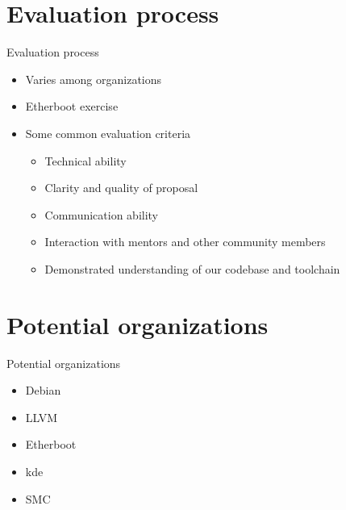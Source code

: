 \documentclass{beamer}
\begin{document}
\section{Evaluation process}
\begin{frame}{Evaluation process}
\begin{itemize}
\item Varies among organizations
\item Etherboot exercise
\item Some common evaluation criteria
\begin{itemize}
\item Technical ability
\item Clarity and quality of proposal
\item Communication ability
\item Interaction with mentors and other community members
\item Demonstrated understanding of our codebase and toolchain
\end{itemize}
\end{itemize}
\end{frame}

\section{Potential organizations}
\begin{frame}{Potential organizations}
\begin{itemize}
\item Debian
\item LLVM
\item Etherboot
\item kde
\item SMC
\end{itemize}
\end{frame}
\end{document}
